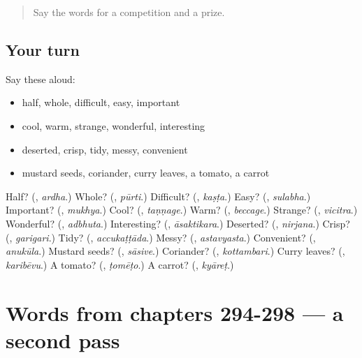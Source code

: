 \label{lesson:KA-R298-first-pass-words-from-chapters-290-293}



\begin{quote}
Say the words for a competition and a prize.
\end{quote}

\subsection*{Your turn}
Say these aloud:

\begin{itemize}
\raggedright
  \item half, whole, difficult, easy, important
  \item cool, warm, strange, wonderful, interesting
  \item deserted, crisp, tidy, messy, convenient
  \item mustard seeds, coriander, curry leaves, a tomato, a carrot
\end{itemize}

\begin{tcolorbox}[breakable,colback=teal!4,colframe=teal!35!black,title={Before you move on}]
Half? (\textbf{}, \emph{ardha}.) Whole? (\textbf{}, \emph{pūrti}.) Difficult? (\textbf{}, \emph{kaṣṭa}.) Easy? (\textbf{}, \emph{sulabha}.) Important? (\textbf{}, \emph{mukhya}.) Cool? (\textbf{}, \emph{taṇṇage}.) Warm? (\textbf{}, \emph{beccage}.) Strange? (\textbf{}, \emph{vicitra}.) Wonderful? (\textbf{}, \emph{adbhuta}.) Interesting? (\textbf{}, \emph{āsaktikara}.) Deserted? (\textbf{}, \emph{nirjana}.) Crisp? (\textbf{}, \emph{garigari}.) Tidy? (\textbf{}, \emph{accukaṭṭāda}.) Messy? (\textbf{}, \emph{astavyasta}.) Convenient? (\textbf{}, \emph{anukūla}.) Mustard seeds? (\textbf{}, \emph{sāsive}.) Coriander? (\textbf{}, \emph{kottambari}.) Curry leaves? (\textbf{}, \emph{karibēvu}.) A tomato? (\textbf{}, \emph{ṭomēṭo}.) A carrot? (\textbf{}, \emph{kyāreṭ}.)
\end{tcolorbox}
\section[(dialogue)]{Words from chapters 294-298 — a second pass}

\label{lesson:KA-R298-second-pass-words-from-chapters-294-298}



